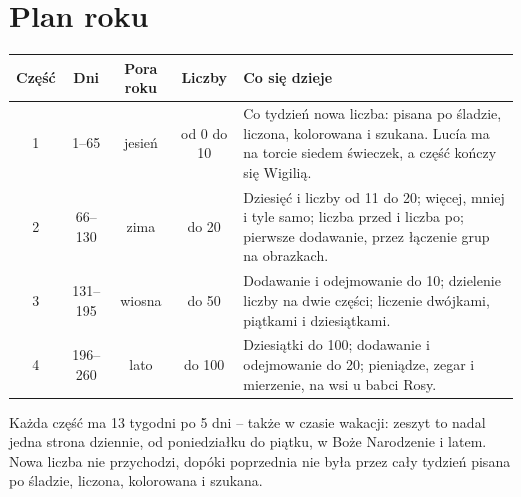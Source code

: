 \section*{Plan roku}

\begin{center}
\renewcommand{\arraystretch}{1.4}
\begin{tabularx}{\linewidth}{@{}c c c c X@{}}
\toprule
\textbf{Część} & \textbf{Dni} & \textbf{Pora roku} & \textbf{Liczby} & \textbf{Co się dzieje} \\
\midrule
1 & 1--65 & jesień & od 0 do 10 & Co tydzień nowa liczba: pisana po
śladzie, liczona, kolorowana i szukana. Lucía ma na torcie siedem
świeczek, a część kończy się Wigilią. \\
2 & 66--130 & zima & do 20 & Dziesięć i liczby od 11 do 20; więcej,
mniej i tyle samo; liczba przed i liczba po; pierwsze dodawanie, przez
łączenie grup na obrazkach. \\
3 & 131--195 & wiosna & do 50 & Dodawanie i odejmowanie do 10; dzielenie
liczby na dwie części; liczenie dwójkami, piątkami i dziesiątkami. \\
4 & 196--260 & lato & do 100 & Dziesiątki do 100; dodawanie i
odejmowanie do 20; pieniądze, zegar i mierzenie, na wsi u babci Rosy. \\
\bottomrule
\end{tabularx}
\end{center}

\vspace{6mm}
Każda część ma 13 tygodni po 5 dni -- także w czasie wakacji: zeszyt to
nadal jedna strona dziennie, od poniedziałku do piątku, w Boże
Narodzenie i latem. Nowa liczba nie przychodzi, dopóki poprzednia nie
była przez cały tydzień pisana po śladzie, liczona, kolorowana i
szukana.
\newpage
